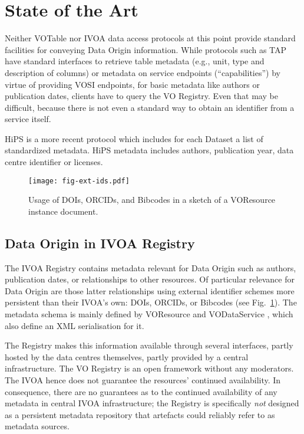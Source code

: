 \documentclass[11pt,a4paper]{ivoa}
\begin{document}
\section{State of the Art}

Neither VOTable \citep{2019ivoa.spec.1021O} nor IVOA data access protocols at this point provide standard facilities for conveying Data Origin information. While protocols such as TAP \citep{2019ivoa.spec.0927D} have standard interfaces to retrieve table metadata (e.g., unit, type and description of columns) or metadata on service endpoints (``capabilities'') by virtue of providing VOSI \citep{2017ivoa.spec.0524G} endpoints, for basic metadata like authors or publication dates,  clients have to query the VO Registry.  Even that may be difficult, because there is not even a standard way to obtain an identifier from a service itself.

HiPS \citep{2017ivoa.spec.0519F} is a more recent protocol which includes for each Dataset a list of standardized metadata. HiPS metadata includes authors, publication year, data centre identifier or licenses.

\begin{figure}
\centering
\texttt{[image: fig-ext-ids.pdf]}
\caption{Usage of DOIs, ORCIDs, and Bibcodes in a sketch of a
VOResource instance document.}
\label{fig:extids}
\end{figure}

\subsection{Data Origin in IVOA Registry}
The IVOA Registry contains metadata relevant for Data Origin such as authors,
publication dates,
or relationships to other resources.  Of particular relevance for Data
Origin are those latter relationships using external identifier schemes
more persistent than their IVOA's own: DOIs, ORCIDs, or Bibcodes (see
Fig.~\ref{fig:extids}).  The  metadata schema is mainly defined by
VOResource \citep{2018ivoa.spec.0625P} and VODataService
\citep{2021ivoa.spec.1102D}, which also define an XML serialisation for it.

The Registry makes this information available through several interfaces, partly
hosted by the data centres themselves, partly provided by a central
infrastructure.
The VO Registry is an open framework without any moderators.
The IVOA hence does not guarantee the resources' continued availability.
In consequence, there are no guarantees as to the continued availability
of any metadata in central IVOA infrastructure; the Registry is
specifically \emph{not} designed as a persistent metadata repository
that artefacts could reliably refer to as metadata sources.
\end{document}
